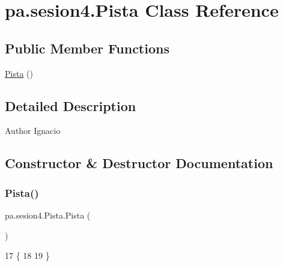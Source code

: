 \hypertarget{classpa_1_1sesion4_1_1_pista}{}\section{pa.\+sesion4.\+Pista Class Reference}
\label{classpa_1_1sesion4_1_1_pista}
\subsection*{Public Member Functions}
\begin{DoxyCompactItemize}
\item 
\mbox{\hyperlink{classpa_1_1sesion4_1_1_pista_a8faa7564feddaf9c330944f6c7403b2c}{Pista}} ()
\end{DoxyCompactItemize}


\subsection{Detailed Description}
\begin{DoxyAuthor}{Author}
Ignacio 
\end{DoxyAuthor}


\subsection{Constructor \& Destructor Documentation}
\mbox{\label{classpa_1_1sesion4_1_1_pista_a8faa7564feddaf9c330944f6c7403b2c}} 
\subsubsection{\texorpdfstring{Pista()}{Pista()}}
{\footnotesize\ttfamily pa.\+sesion4.\+Pista.\+Pista (\begin{DoxyParamCaption}{ }\end{DoxyParamCaption})\hspace{0.3cm}{\ttfamily [inline]}}


\begin{DoxyCode}
17     \{
18         
19     \}
\end{DoxyCode}
